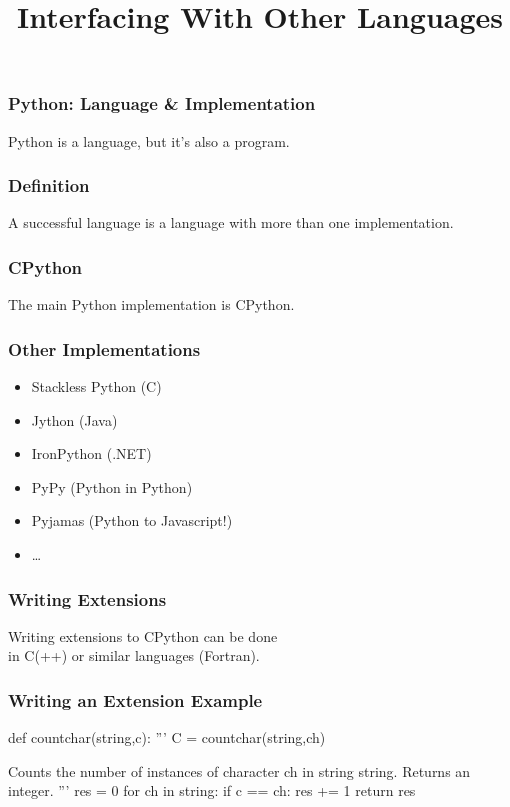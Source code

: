 
\title{Interfacing With Other Languages}

\frame{\maketitle}

\begin{frame}[fragile]
\frametitle{Python: Language \& Implementation}
Python is a language, but it's also a program.
\end{frame}

\begin{frame}[fragile]
\frametitle{Definition}

A \alert{successful language} is a language with more than one implementation.

\end{frame}

\begin{frame}[fragile]
\frametitle{CPython}
The main Python implementation is \alert{CPython}.
\end{frame}

\begin{frame}[fragile]
\frametitle{Other Implementations}
\begin{itemize}
\item Stackless Python (C)
\item Jython (Java)
\item IronPython (.NET)
\item PyPy (Python in Python)
\item Pyjamas (Python to Javascript!)
\item \ldots{}
\end{itemize}
\end{frame}

\begin{frame}[fragile]
\frametitle{Writing Extensions}
Writing extensions to CPython can be done\\
in C(++) or similar languages (Fortran).
\end{frame}

\begin{frame}[fragile]
\frametitle{Writing an Extension Example}

\begin{python}
def countchar(string,c):
    '''
    C = countchar(string,ch)

    Counts the number of instances of character ch
    in string string. Returns an integer.
    '''
    res = 0
    for ch in string:
        if c == ch:
            res += 1
    return res
\end{python}
\end{frame}


